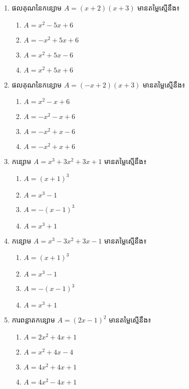 \begin{enumerate}
\item ផលគុណនៃកន្សោម $A=(x+2)(x+3)$ មានតម្លៃស្មើនឹង៖
\begin{multicols}{2}
\begin{enumerate}[label=\alph*.]
\item $A=x^2-5x+6$
\item $A=-x^2+5x+6$
\item $A=x^2+5x-6$
\item $A=x^2+5x+6$
\end{enumerate}
\end{multicols}

\item ផលគុណនៃកន្សោម $A=(-x+2)(x+3)$ មានតម្លៃស្មើនឹង៖
\begin{multicols}{2}
\begin{enumerate}[label=\alph*.]
\item $A=x^2-x+6$
\item $A=-x^2-x+6$
\item $A=-x^2+x-6$
\item $A=-x^2+x+6$
\end{enumerate}
\end{multicols}

\item កន្សោម $A=x^3+3x^2+3x+1$ មានតម្លៃស្មើនឹង៖
\begin{multicols}{4}
\begin{enumerate}[label=\alph*.]
\item $A=(x+1)^3$
\item $A=x^3-1$
\item $A=-(x-1)^3$
\item $A=x^3+1$
\end{enumerate}
\end{multicols}

\item កន្សោម $A=x^3-3x^2+3x-1$ មានតម្លៃស្មើនឹង៖
\begin{multicols}{4}
\begin{enumerate}[label=\alph*.]
\item $A=(x+1)^3$
\item $A=x^3-1$
\item $A=-(x-1)^3$
\item $A=x^3+1$
\end{enumerate}
\end{multicols}

\item ការពន្លាតកន្សោម $A=(2x-1)^2$ មានតម្លៃស្មើនឹង៖
\begin{multicols}{2}
\begin{enumerate}[label=\alph*.]
\item $A=2x^2+4x+1$
\item $A=x^2+4x-4$
\item $A=4x^2+4x+1$
\item $A=4x^2-4x+1$
\end{enumerate}
\end{multicols}


\end{enumerate}
